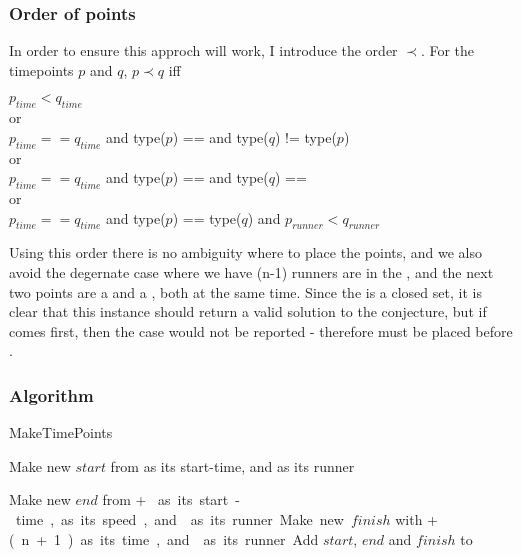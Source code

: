 \subsubsection{Order of points}
In order to ensure this approch will work, I introduce the order $\prec$. For the timepoints $p$ and $q$, $p \prec q$ iff \\

\begin{center}
$p_{time} < q_{time}$\\
or \\
$p_{time} == q_{time}$ and type($p$) == \comFin and type($q$) != type($p$)\\
or \\
$p_{time} == q_{time}$ and type($p$) == \comStart and type($q$) == \comEnd \\
or \\
$p_{time} == q_{time}$ and type($p$) == type($q$) and $p_{runner} < q_{runner}$
\end{center}

Using this order there is no ambiguity where to place the points, and we also avoid the degernate case where we have (n-1) runners are in the \zone, and the next two points are a \comEnd and a \comStart, both at the same time. Since the \zone is a closed set, it is clear that this instance should return a valid solution to the conjecture, but if \comEnd comes first, then the case would not be reported - therefore \comStart must be placed before \comEnd.

\subsubsection{Algorithm}
\begin{algorithm}[H]
\caption{MakeTimePoints}
\highlights
{}
 
Make new \startT $start$ from \start as its start-time, and \run as its runner
  
Make new \eT $end$ from \start + \unit * \n as its start-time, \unit as its speed, and \run as its runner
  
Make new \finish $finish$ with \start + \unit * (n+1) as its time, and \run as its runner
  
Add $start$, $end$ and $finish$ to \li

\return \li
\end{algorithm}

